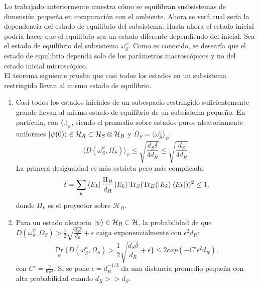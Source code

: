 Lo trabajado anteriormente muestra cómo se equilibran susbsistemas de dimensión pequeña en comparación con el ambiente. Ahora se verá cual sería la dependencia del estado de equilibrio del subsistema. Hasta ahora el estado inicial podría hacer que el equilibrio sea un estado diferente dependiendo del inicial. Sea el estado de equilibrio del subsistema $\omega_{S}^{\psi}$. Como es conocido, se desearía que el estado de equilibrio dependa solo de los parámetros macroscópicos y no del estado inicial microscópico.
\\
El teorema siguiente prueba que casi todos los estados en un subsistema restringido llevan al mismo estado de equilibrio.
\begin{theorem} \label{mismo estado}
\begin{enumerate}
\item Casi todos los estados iniciales de un subespacio restringido suficientemente grande llevan al mismo estado de equilibrio de un subsistema pequeño. En partícula, con $\langle .\rangle_{\psi}$, siendo el promedio sobre estados puros aleatoriamente uniformes $\ket{\psi(0)} \in \mathcal{H}_{R} \subset \mathcal{H}_{S} \otimes \mathcal{H}_{B}$ y $\Omega_{S}= \langle \omega_{S}^{\psi} \rangle_{\psi}$:
\begin{equation}
\langle D(\omega_{S}^{\psi}, \Omega_{S}) \rangle_{\psi} \leq \sqrt{\frac{d_{S} \delta}{4d_{R}}} \leq \sqrt{\frac{d_{S}}{4d_{R}}}.
\end{equation}
La primera desigualdad es más estricta pero más complicada 
\begin{equation}
\delta= \sum_{k}\bra{E_{k}}\frac{\Pi_{R}}{d_{R}}\ket{E_{k}} \Tr_{S} ( \Tr_{B} (\ket{E_{k}} \bra{E_{k}}) )^{2} \leq  1,
\end{equation}
donde $\Pi_{k}$ es el proyector sobre $\mathcal{H}_{R}$.
\item Para un estado aleatorio $\ket{\psi} \in \mathcal{H}_{R}\subset \mathcal{H}$, la probabilidad de que $D(\omega_{S}^{\psi},\Omega_{S}) > \frac{1}{2} \sqrt{\frac{d_{S} \delta}{d_{R}}}+ \epsilon$ caiga exponencialmente con $\epsilon^{2}d_{R}$:
\begin{equation}
\Pr_{\psi} \bigg \{ D(\omega_{S}^{\psi}, \Omega_{S}) > \frac{1}{2}\sqrt{\frac{d_{S} \delta}{d_{R}}} + \epsilon \bigg \} \leq 2exp(-C'\epsilon^{2}d_{R}),
\end{equation}
con $C'=\frac{2}{9 \pi^{3}}$. Si se pone $\epsilon=d_{R}^{-1/3}$ da una distancia promedio pequeña con alta probabilidad cuando $d_{R}>>d_{S}$.
\end{enumerate}
\end{theorem}
